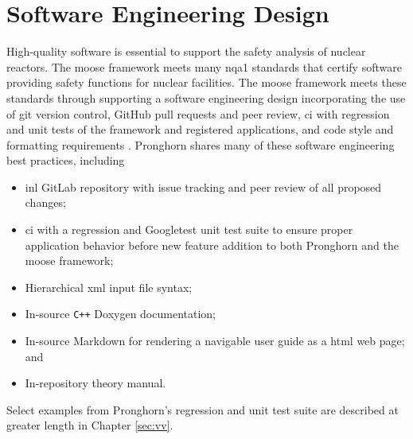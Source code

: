 \section{Software Engineering Design}
\label{sec:software}

High-quality software is essential to support the safety analysis of nuclear reactors. The \gls{moose} framework meets many \gls{nqa1} standards that certify software providing safety functions for nuclear facilities. The \gls{moose} framework meets these standards through supporting a software engineering design incorporating the use of git version control, GitHub pull requests and peer review, \gls{ci} with regression and unit tests of the framework and registered applications, and code style and formatting requirements \cite{slaughter}. Pronghorn shares many of these software engineering best practices, including\mdash

\begin{itemize}
\itemsep0.3em
\item \gls{inl} GitLab repository with issue tracking and peer review of all proposed changes;
\item \gls{ci} with a regression and Googletest unit test suite to ensure proper application behavior before new feature addition to both Pronghorn and the \gls{moose} framework;
\item Hierarchical \gls{xml} input file syntax;
\item In-source \texttt{C++} Doxygen documentation;
\item In-source Markdown for rendering a navigable user guide as a \gls{html} web page; and
\item In-repository theory manual.
\end{itemize}

Select examples from Pronghorn's regression and unit test suite are described at greater length in Chapter \ref{sec:vv}.
